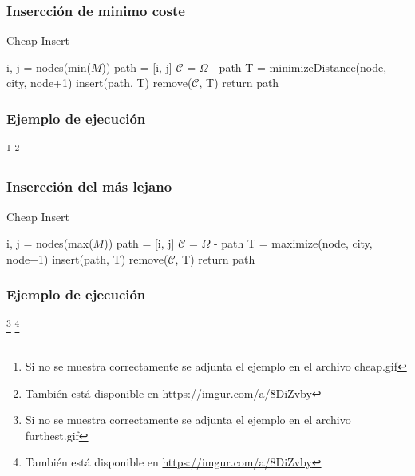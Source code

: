 \documentclass[spanish]{beamer}
\begin{document}
\begin{frame}\frametitle{Insercción de minimo coste}
  \begin{algorithm}[H]
    \caption{Cheap Insert}
    \begin{algorithmic}
      \State i, j = nodes(min($M$))
      \State path = [i, j]
      \State $\mathcal{C}$ = $\Omega$ - path
      \State T = minimizeDistance(node, city, node+1)
      \EndFor
      \State insert(path, T)
      \State remove($\mathcal{C}$, T)
      \EndIf
      \EndFor
      \EndWhile
      \State return path
    \end{algorithmic}
  \end{algorithm}
  
\end{frame}

\begin{frame}\frametitle{Ejemplo de ejecución}
  \footnote[1]{Si no se muestra correctamente se adjunta el ejemplo en el archivo cheap.gif}
  \footnote[2]{También está disponible en \href{https://imgur.com/a/8DiZvby}{https://imgur.com/a/8DiZvby}}
\end{frame}

\begin{frame}\frametitle{Insercción del más lejano}
  \begin{algorithm}[H]
    \caption{Cheap Insert}
    \begin{algorithmic}
      \State i, j = nodes(max($M$))
      \State path = [i, j]
      \State $\mathcal{C}$ = $\Omega$ - path
      \State T = maximize(node, city, node+1)
      \EndFor
      \State insert(path, T)
      \State remove($\mathcal{C}$, T)
      \EndIf
      \EndFor
      \EndWhile
      \State return path
    \end{algorithmic}
  \end{algorithm}
\end{frame}

\begin{frame}\frametitle{Ejemplo de ejecución}
  \footnote[1]{Si no se muestra correctamente se adjunta el ejemplo en el archivo furthest.gif}
  \footnote[2]{También está disponible en \href{https://imgur.com/a/8DiZvby}{https://imgur.com/a/8DiZvby}}
\end{frame}
\end{document}
